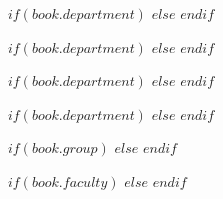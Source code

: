 

\examiner{} %


\author{$author$} %

\addresses{} %

\subject{} %

\keywords{} %

$if(book.department)$
$else$\city{}
$endif$

$if(book.department)$
$else$\dateyear{}
$endif$

$if(book.department)$
$else$\university{}
$endif$

$if(book.department)$
$else$\department{}
$endif$

$if(book.group)$
$else$\group{}
$endif$

$if(book.faculty)$
$else$
\faculty{}
$endif$

\setcounter{tocdepth}{$if(toc-depth)$$toc-depth$$else$3$endif$} %
